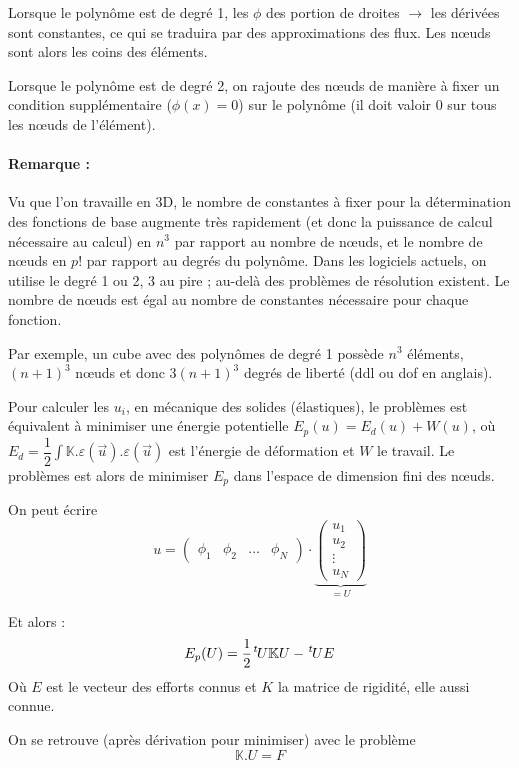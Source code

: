 \documentclass{article}
\newcommand{\transpose}{\hspace{.1em}{}^t\hspace{-.1em}}
\begin{document}
Lorsque le polynôme est de degré 1, les $\phi$ des portion de droites $\to$ les dérivées sont constantes, ce qui se traduira par des approximations des flux. Les nœuds sont alors les coins des éléments.

Lorsque le polynôme est de degré 2, on rajoute des nœuds de manière à fixer un condition supplémentaire ($\phi (x) = 0$) sur le polynôme (il doit valoir 0 sur tous les nœuds de l'élément).

\paragraph{Remarque :} Vu que l'on travaille en 3D, le nombre de constantes à fixer pour la détermination des fonctions de base augmente très rapidement (et donc la puissance de calcul nécessaire au calcul) en $n^3$ par rapport au nombre de nœuds, et le nombre de nœuds en $p!$ par rapport au degrés du polynôme. Dans les logiciels actuels, on utilise le degré 1 ou 2, 3 au pire ; au-delà des problèmes de résolution existent. Le nombre de nœuds est égal au nombre de constantes nécessaire pour chaque fonction.

Par exemple, un cube avec des polynômes de degré 1 possède $n^3$ éléments, $(n+1)^3$ nœuds et donc $3(n+1)^3$ degrés de liberté (ddl ou dof en anglais).


Pour calculer les $u_i$, en mécanique des solides (élastiques), le problèmes est équivalent à minimiser une énergie potentielle $E_p(u)=E_d(u) + W(u)$, où $E_d = \dfrac{1}{2}\int \mathbb{K}.\varepsilon (\vec{u}).\varepsilon(\vec{u})$ est l'énergie de déformation et $W$ le travail. Le problèmes est alors de minimiser $E_p$ dans l'espace de dimension fini des nœuds.

On peut écrire 
\[u=\begin{pmatrix}
\phi_1 & \phi_2 & \hdots & \phi_N
\end{pmatrix}
\cdot
\underbrace{
\begin{pmatrix}
u_1\\
u_2\\
\vdots\\
u_N
\end{pmatrix}}_{= U}
\]

Et alors :
\[E_p(U)=\dfrac{1}{2}\transpose U \mathbb{K} U - \transpose U E\]
Où $E$ est le vecteur des efforts connus et $K$ la matrice de rigidité, elle aussi connue.

On se retrouve (après dérivation pour minimiser) avec le problème 
\[\mathbb{K}.U=F\]
\end{document}
